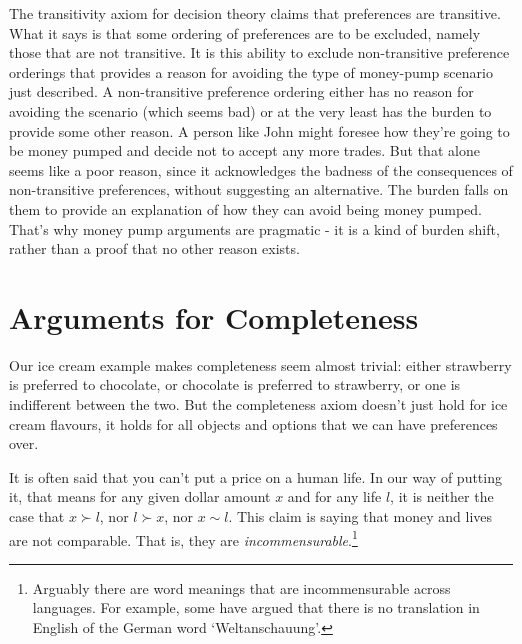 \documentclass[]{tufte-book}
\begin{document}
The transitivity axiom for decision theory claims that preferences are transitive. What it says is that some ordering of preferences are to be excluded, namely those that are not transitive. It is this ability to exclude non-transitive preference orderings that provides a reason for avoiding the type of money-pump scenario just described. A non-transitive preference ordering either has no reason for avoiding the scenario (which seems bad) or at the very least has the burden to provide some other reason. A person like John might foresee how they're going to be money pumped and decide not to accept any more trades. But that alone seems like a poor reason, since it acknowledges the badness of the consequences of non-transitive preferences, without suggesting an alternative. The burden falls on them to provide an explanation of how they can avoid being money pumped. That's why money pump arguments are pragmatic - it is a kind of burden shift, rather than a proof that no other reason exists.

\hypertarget{arguments-for-completeness}{%
\section{Arguments for Completeness}\label{arguments-for-completeness}}

Our ice cream example makes completeness seem almost trivial: either strawberry is preferred to chocolate, or chocolate is preferred to strawberry, or one is indifferent between the two. But the completeness axiom doesn't just hold for ice cream flavours, it holds for all objects and options that we can have preferences over.

It is often said that you can't put a price on a human life. In our way of putting it, that means for any given dollar amount \(x\) and for any life \(l\), it is neither the case that \(x\succ l\), nor \(l\succ x\), nor \(x\sim l\). This claim is saying that money and lives are not comparable. That is, they are \emph{incommensurable}.\footnote{Arguably there are word meanings that are incommensurable across languages. For example, some have argued that there is no translation in English of the German word `Weltanschauung'.}
\end{document}
